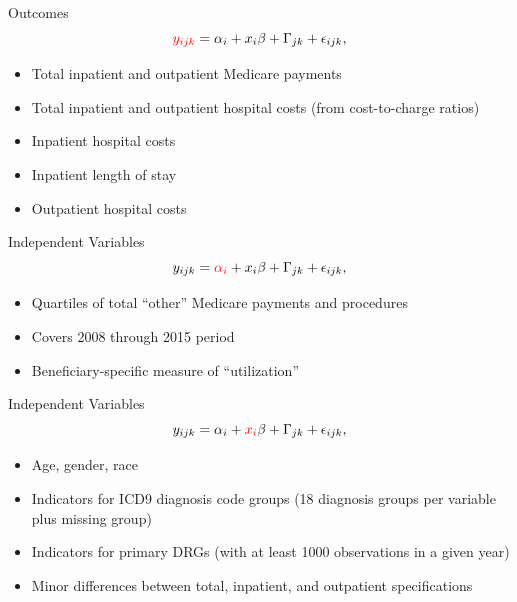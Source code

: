 \documentclass[t]{beamer}
\begin{document}
\begin{frame}{Outcomes}
    \begin{equation*}
        \textcolor{red}{y_{ijk}} = \alpha_{i} + x_{i}\beta + \Gamma_{jk} + \epsilon_{ijk},
    \end{equation*}

    \begin{itemize}
        \item Total inpatient and outpatient Medicare payments
        \item Total inpatient and outpatient hospital costs (from cost-to-charge ratios)
        \item Inpatient hospital costs
        \item Inpatient length of stay
        \item Outpatient hospital costs
    \end{itemize}
\end{frame}


\begin{frame}{Independent Variables}
    \begin{equation*}
        y_{ijk} = \textcolor{red}{\alpha_{i}} + x_{i}\beta + \Gamma_{jk} + \epsilon_{ijk},
    \end{equation*}

    \begin{itemize}
        \item Quartiles of total ``other'' Medicare payments and procedures
        \item Covers 2008 through 2015 period
        \item Beneficiary-specific measure of ``utilization''
    \end{itemize}
\end{frame}

\begin{frame}{Independent Variables}
    \begin{equation*}
        y_{ijk} = \alpha_{i} + \textcolor{red}{x_{i}}\beta + \Gamma_{jk} + \epsilon_{ijk},
    \end{equation*}

    \begin{itemize}
        \item Age, gender, race
        \item Indicators for ICD9 diagnosis code groups (18 diagnosis groups per variable plus missing group)
        \item Indicators for primary DRGs (with at least 1000 observations in a given year)
        \item Minor differences between total, inpatient, and outpatient specifications
    \end{itemize}
\end{frame}
\end{document}
